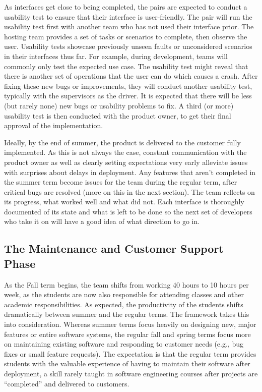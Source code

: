 As interfaces get close to being completed, the pairs are expected to conduct a usability test \cite{usabilitytesting} to ensure that their interface is user-friendly. The pair will run the usability test first with another team who has not used their interface prior. The hosting team provides a set of tasks or scenarios to complete, then observe the user. Usability tests showcase previously unseen faults or unconsidered scenarios in their interfaces thus far. For example, during development, teams will commonly only test the expected use case. The usability test might reveal that there is another set of operations that the user can do which causes a crash. After fixing these new bugs or improvements, they will conduct another usability test, typically with the supervisors as the driver. It is expected that there will be less (but rarely none) new bugs or usability problems to fix. A third (or more) usability test is then conducted with the product owner, to get their final approval of the implementation.  

Ideally, by the end of summer, the product is delivered to the customer fully implemented. As this is not always the case, constant communication with the product owner as well as clearly setting expectations very early alleviate issues with surprises about delays in deployment. Any features that aren't completed in the summer term become issues for the team during the regular term, after critical bugs are resolved (more on this in the next section). The team reflects on its progress, what worked well and what did not. Each interface is thoroughly documented of its state and what is left to be done so the next set of developers who take it on will have a good idea of what direction to go in.

\subsection{The Maintenance and Customer Support Phase}
As the Fall term begins, the team shifts from working 40 hours to 10 hours per week, as the students are now also responsible for attending classes and other academic responsibilities. As expected, the productivity of the students shifts dramatically between summer and the regular terms. The framework takes this into consideration. Whereas summer terms focus heavily on designing new, major features or entire software systems, the regular fall and spring terms focus more on maintaining existing software and responding to customer needs (e.g., bug fixes or small feature requests). The expectation is that the regular term provides students with the valuable experience of having to maintain their software after deployment, a skill rarely taught in software engineering courses after projects are ``completed'' and delivered to customers.

